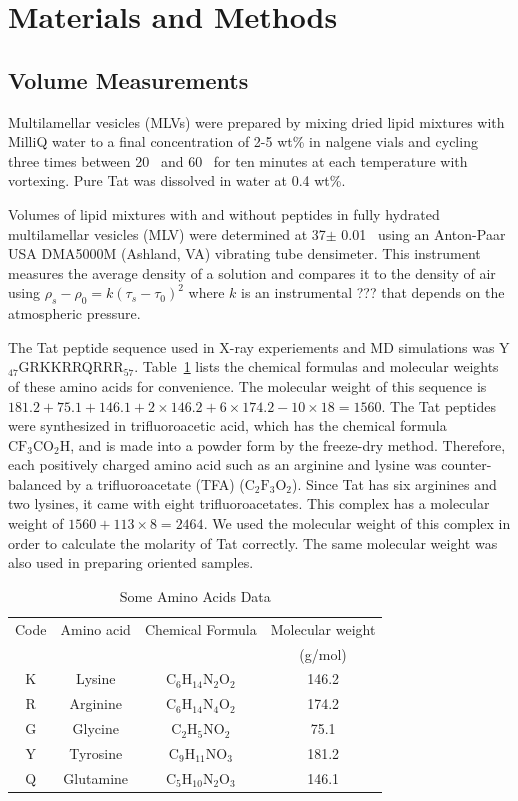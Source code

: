 \section{Materials and Methods}
\subsection{Volume Measurements}\label{sec:volume_method}
Multilamellar vesicles (MLVs) were prepared by mixing dried lipid mixtures with 
MilliQ water to a final concentration of 2-5 wt\% in nalgene vials and cycling 
three times between 20 \textcelsius\ and 60 \textcelsius\ for ten minutes at 
each temperature with vortexing. Pure Tat was dissolved in water at 0.4 wt\%.

Volumes of lipid mixtures with and without peptides in fully hydrated 
multilamellar vesicles (MLV) were determined at 37$\pm$ 0.01 \textcelsius\ 
using an Anton-Paar USA DMA5000M (Ashland, VA) vibrating tube densimeter. 
This instrument measures the average density of a solution and compares it to
the density of air using $\rho_s-\rho_0=k(\tau_s-\tau_0)^2$ where $k$ is
an instrumental ??? that depends on the atmospheric pressure. 

The Tat peptide sequence used in X-ray experiements and MD simulations was 
Y$_{47}$GRKKRRQRRR$_{57}$. Table~\ref{tb:aa} lists the chemical formulas and 
molecular weights of these amino acids for convenience. The molecular weight of 
this sequence is 
$181.2+75.1+146.1+2 \times 146.2+6\times 174.2-10\times 18=1560$.
The Tat peptides were synthesized in trifluoroacetic acid, which has 
the chemical formula $\mathrm{CF_3CO_2H}$, and is made into a powder form by the 
freeze-dry method. Therefore, each positively charged amino acid such as 
an arginine and lysine was counter-balanced by a trifluoroacetate (TFA)
($\mathrm{C_2F_3O_2}$). Since Tat has six arginines and two lysines, it came 
with eight trifluoroacetates. This complex has a molecular weight of 
$1560+113\times 8=2464$. We used the 
molecular weight of this complex in order to calculate the molarity of Tat
correctly. The same molecular weight was also used in preparing oriented 
samples.

\begin{table}[htbp]
  \centering
  \begin{tabular}{c c c c}
    \hline
    Code & Amino acid & Chemical Formula & Molecular weight \\
    & & & (g/mol) \\
    \hline
    K & Lysine & $\mathrm{C_6H_{14}N_2O_2}$ & 146.2 \\
    R & Arginine & $\mathrm{C_6H_{14}N_4O_2}$ & 174.2 \\
    G & Glycine & $\mathrm{C_2H_5NO_2}$ & 75.1\\
    Y & Tyrosine & $\mathrm{C_9H_{11}NO_3}$ & 181.2 \\
    Q & Glutamine & $\mathrm{C_5H_{10}N_2O_3}$ & 146.1 \\ 
    \hline
  \end{tabular}
  \caption{Some Amino Acids Data}
  \label{tb:aa}
\end{table}

